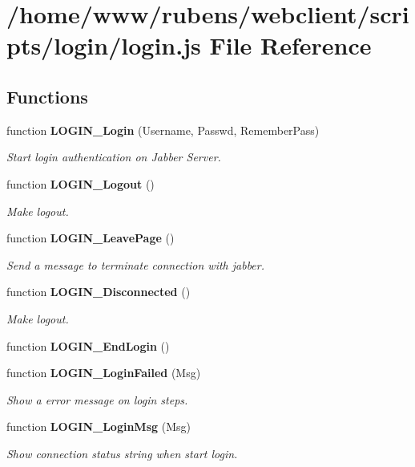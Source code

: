 \section{/home/www/rubens/webclient/scripts/login/login.js File Reference}
\label{login_2login_8js}
\subsection*{Functions}
\begin{CompactItemize}
\item 
function {\bf LOGIN\_\-Login} (Username, Passwd, RememberPass)
\begin{CompactList}\small\item\em Start login authentication on Jabber Server. \item\end{CompactList}\item 
function {\bf LOGIN\_\-Logout} ()
\begin{CompactList}\small\item\em Make logout. \item\end{CompactList}\item 
function {\bf LOGIN\_\-LeavePage} ()
\begin{CompactList}\small\item\em Send a message to terminate connection with jabber. \item\end{CompactList}\item 
function {\bf LOGIN\_\-Disconnected} ()
\begin{CompactList}\small\item\em Make logout. \item\end{CompactList}\item 
function {\bf LOGIN\_\-EndLogin} ()
\item 
function {\bf LOGIN\_\-LoginFailed} (Msg)
\begin{CompactList}\small\item\em Show a error message on login steps. \item\end{CompactList}\item 
function {\bf LOGIN\_\-LoginMsg} (Msg)
\begin{CompactList}\small\item\em Show connection status string when start login. \item\end{CompactList}\end{CompactItemize}


